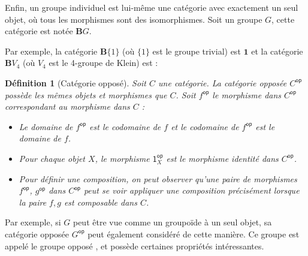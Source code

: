\documentclass[justified]{tufte-handout}
\newtheorem{definition}{Définition}
\def\msf{\mathsf}
\def\mbf{\mathbold}
\begin{document}
Enfin, un groupe individuel est lui-même une catégorie avec exactement un seul
objet, où tous les morphismes sont des isomorphismes. Soit un groupe $G$, cette
catégorie est notée $\mbf{B}G$.

Par exemple, la catégorie $\mbf{B}\{1\}$ (où $\{1\}$ est le groupe trivial) est
$\mbf{1}$ et la catégorie $\mbf{B}V_4$ (où $V_4$ est le 4-groupe de Klein) est
:

\begin{center}
\end{center}

\begin{definition}[Catégorie opposé]
	Soit $C$ une catégorie.
	La catégorie opposée $C^{\msf{op}}$ possède les mêmes objets et morphismes que $C$.
	Soit $f^{\msf{op}}$ le morphisme dans $C^{\msf{op}}$ correspondant au morphisme dans $C$ :
	\begin{itemize}
		\item[(i)] Le domaine de $f^{\msf{op}}$ est le codomaine de $f$ et le codomaine de $f^{\msf{op}}$ est le domaine de $f$.
		\item[(ii)] Pour chaque objet $X$, le morphisme $\msf{1}_X^{\msf{op}}$ est le morphisme identité dans $C^{\msf{op}}$.
		\item[(iii)] Pour définir une composition, on peut observer qu'une paire de morphismes $f^{\msf{op}}$, $g^{\msf{op}}$ dans $C^{\msf{op}}$ peut se voir appliquer une composition précisément lorsque la paire $f, g$ est composable dans $C$.
	\end{itemize}
\end{definition}

Par exemple, si $G$ peut être vue comme un groupoïde  à un seul objet, sa catégorie opposée
$G^{\msf{op}}$ peut également considéré de cette manière. Ce groupe est appelé
le \flqq{} groupe opposé \frqq{}, et possède certaines propriétés
intéressantes.
\end{document}
